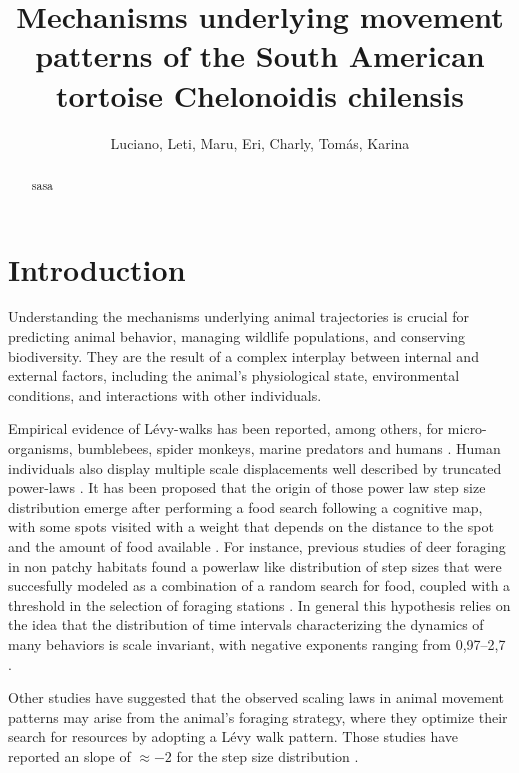 \documentclass[a4paper]{article}
\begin{document}
\title{Mechanisms underlying movement patterns of the South American tortoise Chelonoidis chilensis}
\author{Luciano, Leti, Maru, Eri, Charly, Tomás, Karina}

\maketitle

\begin{abstract}

sasa

\end{abstract}



\section*{Introduction}
Understanding the mechanisms underlying animal trajectories is crucial for predicting animal behavior, managing wildlife populations, and conserving biodiversity. They are the result of a complex interplay between internal and external factors, including the animal's physiological state, environmental conditions, and interactions with other individuals.

Empirical evidence of Lévy-walks has been reported, among others, for micro-organisms, bumblebees, spider monkeys, marine predators and humans \cite{boyer2009}. Human individuals also display multiple scale displacements well described by truncated power-laws \cite{gonzalez2009}. It has been proposed that the origin of those power law step size distribution emerge after performing a food search following a cognitive map, with some spots visited with a weight that depends on the distance to the spot and the amount of food available \cite{boyer2009}. For instance, previous studies of deer foraging in non patchy habitats found a powerlaw like distribution of step sizes that were succesfully modeled as a combination of a random search for food, coupled with a threshold in the selection of foraging stations \cite{focardi1996}. In general this hypothesis relies on the idea that the distribution of time intervals characterizing the dynamics of many behaviors is scale invariant, with negative exponents ranging from 0,97--2,7 \cite{proekt2012}.

Other studies have suggested that the observed scaling laws in animal movement patterns may arise from the animal's foraging strategy, where they optimize their search for resources by adopting a Lévy walk pattern. Those studies have reported an slope of $\approx -2$ for the step size distribution \cite{viswanathan1999}.  
\end{document}
